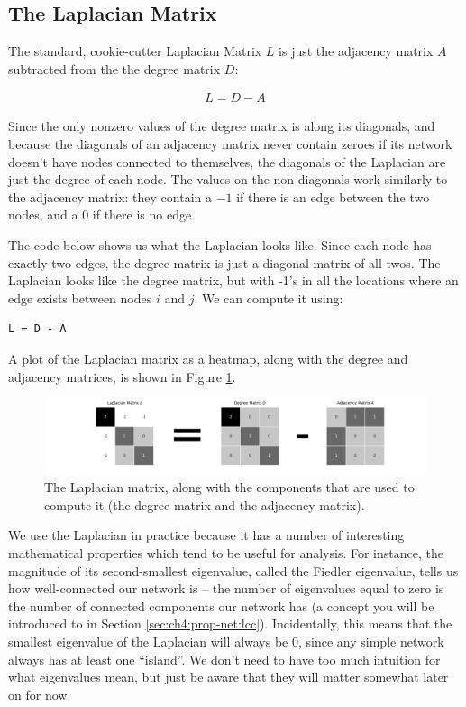 \subsection{The Laplacian Matrix}

The standard, cookie-cutter Laplacian Matrix $L$ \cite{Chung1996Dec} is just the adjacency matrix $A$ subtracted from the the degree matrix $D$:

\begin{align*}
 L = D - A
\end{align*}

Since the only nonzero values of the degree matrix is along its diagonals, and because the diagonals of an adjacency matrix never contain zeroes if its network doesn't have nodes connected to themselves, the diagonals of the Laplacian are just the degree of each node. The values on the non-diagonals work similarly to the adjacency matrix: they contain a $-1$ if there is an edge between the two nodes, and a $0$ if there is no edge.

The code below shows us what the Laplacian looks like. Since each node has exactly two edges, the degree matrix is just a diagonal matrix of all twos. The Laplacian looks like the degree matrix, but with -1's in all the locations where an edge exists between nodes $i$ and $j$. We can compute it using:

\begin{lstlisting}[style=python]
L = D - A
\end{lstlisting}

A plot of the Laplacian matrix as a heatmap, along with the degree and adjacency matrices, is shown in Figure \ref{fig:ch4:simple_lap}.
\begin{figure}[h]
    \centering
    \includegraphics[width=\linewidth]{representations/ch4/Images/simple_lapl.png}
    \caption[Laplacian matrix]{The Laplacian matrix, along with the components that are used to compute it (the degree matrix and the adjacency matrix).}
    \label{fig:ch4:simple_lap}
\end{figure}

We use the Laplacian in practice because it has a number of interesting mathematical properties which tend to be useful for analysis. For instance, the magnitude of its second-smallest eigenvalue, called the Fiedler eigenvalue, tells us how well-connected our network is -- the number of eigenvalues equal to zero is the number of connected components our network has (a concept you will be introduced to in Section \ref{sec:ch4:prop-net:lcc}). Incidentally, this means that the smallest eigenvalue of the Laplacian will always be 0, since any simple network always has at least one ``island''. We don't need to have too much intuition for what eigenvalues mean, but just be aware that they will matter somewhat later on for now.

